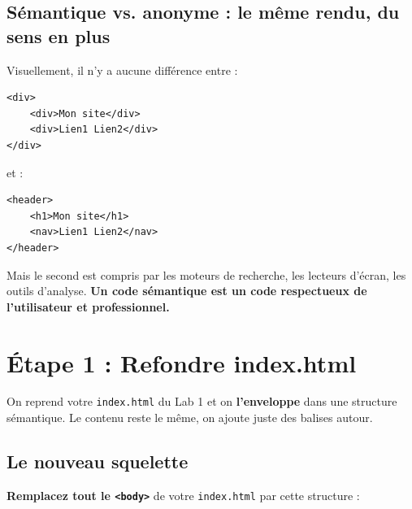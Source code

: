 \documentclass[11pt,a4paper]{article}
\begin{document}
\subsection{Sémantique vs. anonyme : le même rendu, du sens en plus}

Visuellement, il n'y a aucune différence entre :

\begin{lstlisting}[language=HTML5]
<div>
    <div>Mon site</div>
    <div>Lien1 Lien2</div>
</div>
\end{lstlisting}

et :

\begin{lstlisting}[language=HTML5]
<header>
    <h1>Mon site</h1>
    <nav>Lien1 Lien2</nav>
</header>
\end{lstlisting}

Mais le second est compris par les moteurs de recherche, les lecteurs
d'écran, les outils d'analyse. \textbf{Un code sémantique est un code
respectueux de l'utilisateur et professionnel.}

\newpage

\section{Étape 1 : Refondre index.html}

On reprend votre \texttt{index.html} du Lab 1 et on \textbf{l'enveloppe}
dans une structure sémantique. Le contenu reste le même, on ajoute juste
des balises autour.

\subsection{Le nouveau squelette}

\textbf{Remplacez tout le \texttt{<body>}} de votre \texttt{index.html}
par cette structure :
\end{document}
